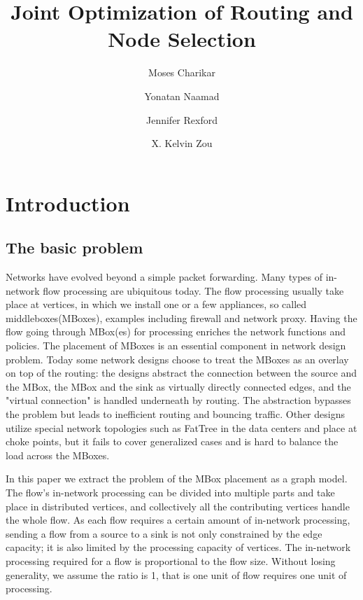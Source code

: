 \documentclass[11pt]{article}
\begin{document}
\title{\Large Joint Optimization of Routing and Node Selection}
\author[]{Moses Charikar}
\author[]{Yonatan Naamad}
\author[]{Jennifer Rexford}
\author[]{X. Kelvin Zou}
\date{}
\maketitle

\section{Introduction}

\subsection{The basic problem}
Networks have evolved beyond a simple packet forwarding. Many types of in-network flow processing are ubiquitous today. The flow processing usually take place at vertices, in which we install one or a few appliances, so called middleboxes(MBoxes), examples including firewall and network proxy. Having the flow going through MBox(es) for processing enriches the network functions and policies. The placement of MBoxes is an essential component in network design problem. Today some network designs choose to treat the MBoxes as an overlay on top of the routing: the designs abstract the connection between the source and the MBox, the MBox and the sink as virtually directly connected edges, and the "virtual connection" is handled underneath by routing\cite{SIMPLE2013}. The abstraction bypasses the problem but leads to inefficient routing and bouncing traffic. Other designs utilize special network topologies such as FatTree\cite{FATTREE} in the data centers and place at choke points, but it fails to cover generalized cases and is hard to balance the load across the MBoxes. 

In this paper we extract the problem of the MBox placement as a graph model. The flow's in-network processing can be divided into multiple parts and take place in distributed vertices, and collectively all the contributing vertices handle the whole flow.  As each flow requires a certain amount of in-network processing, sending a flow from a source to a sink is not only constrained by the edge capacity; it is also limited by the processing capacity of vertices. The in-network processing required for a flow is proportional to the flow size. Without losing generality, we assume the ratio is 1, that is one unit of flow requires one unit of processing. 
\end{document}
